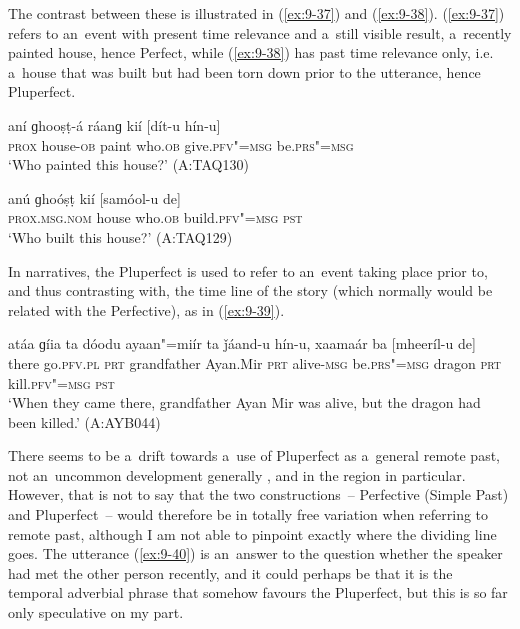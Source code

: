 The contrast between these is illustrated in (\ref{ex:9-37}) and (\ref{ex:9-38}). (\ref{ex:9-37}) refers to an~event with present time relevance and a~still visible result, a~recently painted house, hence Perfect, while (\ref{ex:9-38}) has past time relevance only, i.e. a~house that was built but had been torn down prior to the utterance, hence Pluperfect.

\begin{exe}
\ex
\label{ex:9-37}
\gll aní ɡhooṣṭ-á ráanɡ kií [dít-u hín-u]  \\
\textsc{prox} house-\textsc{ob} paint who.\textsc{ob} give.\textsc{pfv"=msg} be.\textsc{prs"=msg} \\
\glt `Who painted this house?' (A:TAQ130)

\ex
\label{ex:9-38}
\gll anú ɡhoóṣṭ kií [samóol-u de] \\
\textsc{prox.msg.nom} house who.\textsc{ob} build.\textsc{pfv"=msg} \textsc{pst} \\
\glt `Who built this house?' (A:TAQ129)
\end{exe}

In narratives, the Pluperfect is used to refer to an~event taking place prior to, and thus contrasting with, the time line of the story (which normally would be related with the Perfective), as in (\ref{ex:9-39}).

\begin{exe}
\ex
\label{ex:9-39}
\gll atáa ɡíia ta dóodu ayaan"=miír ta ǰáand-u hín-u, xaamaár ba [mheeríl-u de] \\
there go.\textsc{pfv.pl} \textsc{prt} grandfather Ayan.Mir \textsc{prt}  alive-\textsc{msg}
be.\textsc{prs"=msg} dragon \textsc{prt} kill.\textsc{pfv"=msg} \textsc{pst} \\
\glt `When they came there, grandfather Ayan Mir was alive, but the dragon had been killed.' (A:AYB044) 
\end{exe}

There seems to be a~drift towards a~use of Pluperfect as a~general remote past, not an~uncommon development generally \citep[147]{dahl1985}, and in the region in particular. However, that is not to say that the two constructions~-- Perfective (Simple Past) and Pluperfect~-- would therefore be in totally free variation when referring to remote past, although I am not able to pinpoint exactly where the dividing line goes. The utterance (\ref{ex:9-40}) is an~answer to the question whether the speaker had met the other person recently, and it could perhaps be that it is the temporal adverbial phrase that somehow favours the Pluperfect, but this is so far only speculative on my part.

